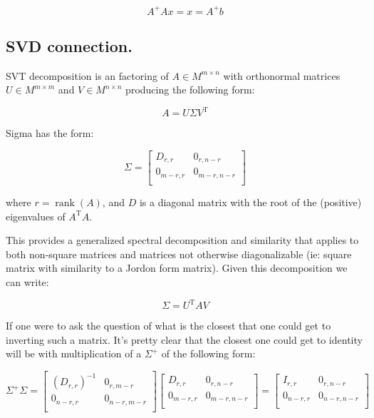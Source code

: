 \documentclass{article}      %
\DeclareMathOperator{\TextTranspose}{T}
\DeclareMathOperator{\rank}{rank}
\newcommand{\transpose}[1]{{{#1}^{\TextTranspose}}}
\begin{document}
\begin{equation}
A^{+} A x = x = A^{+} b
\end{equation}

\subsection{ SVD connection. }

SVT decomposition is an factoring of $A \in M^{m \times n}$ with orthonormal matrices $U \in M^{m \times m}$
and $V \in M^{n \times n} $ producing the following form:

\[
A = U \Sigma \transpose{V}
\]

Sigma has the form:

\[
\Sigma = 
\begin{bmatrix}
D_{r,r} & 0_{r,n-r} \\
0_{m-r,r} & 0_{m-r,n-r} \\
\end{bmatrix}
\]

where $r = \rank(A)$, and $D$ is a diagonal matrix with the root of the (positive) eigenvalues of $\transpose{A}A$.

This provides a generalized spectral decomposition and similarity that applies to both non-square matrices and matrices not otherwise diagonalizable
(ie: square matrix with similarity to a Jordon form matrix).  Given this decomposition we can write:

\[
\Sigma = \transpose{U} A V
\]

If one were to ask the question of what is the closest that one could get to inverting such a matrix.  It's pretty clear that the closest one could get to
identity will be with multiplication of a $\Sigma^{+}$ of the following form:

\[
\Sigma^{+} \Sigma
=
\begin{bmatrix}
(D_{r,r})^{-1} & 0_{r,m-r} \\
0_{n-r,r} & 0_{n-r,m-r} \\
\end{bmatrix}
\begin{bmatrix}
D_{r,r} & 0_{r,n-r} \\
0_{m-r,r} & 0_{m-r,n-r} \\
\end{bmatrix}
=
\begin{bmatrix}
I_{r,r} & 0_{r,n-r} \\
0_{n-r,r} & 0_{n-r,n-r} \\
\end{bmatrix}
\]
\end{document}
